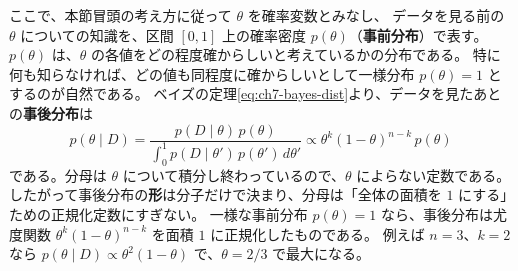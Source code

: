 ここで、本節冒頭の考え方に従って $\theta$ を確率変数とみなし、
データを見る前の $\theta$ についての知識を、区間 $[0, 1]$ 上の確率密度 $p(\theta)$（\textbf{事前分布}）で表す。
$p(\theta)$ は、$\theta$ の各値をどの程度確からしいと考えているかの分布である。
特に何も知らなければ、どの値も同程度に確からしいとして一様分布 $p(\theta) = 1$ とするのが自然である。
ベイズの定理\eqref{eq:ch7-bayes-dist}より、データを見たあとの\textbf{事後分布}は
\begin{equation}
  p(\theta \mid D) = \frac{p(D \mid \theta)\,p(\theta)}{\int_0^1 p(D \mid \theta')\,p(\theta')\,d\theta'}
  \propto \theta^k (1 - \theta)^{n - k}\,p(\theta)
  \label{eq:ch7-coin-post}
\end{equation}
である。分母は $\theta$ について積分し終わっているので、$\theta$ によらない定数である。
したがって事後分布の\textbf{形}は分子だけで決まり、分母は「全体の面積を $1$ にする」ための正規化定数にすぎない。
一様な事前分布 $p(\theta) = 1$ なら、事後分布は尤度関数 $\theta^k(1 - \theta)^{n - k}$ を面積 $1$ に正規化したものである。
例えば $n = 3$、$k = 2$ なら $p(\theta \mid D) \propto \theta^2(1 - \theta)$ で、$\theta = 2/3$ で最大になる。

